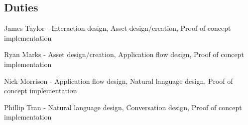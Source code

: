 \documentclass{sigchi}
\begin{document}
\subsection{Duties}

James Taylor - Interaction design, Asset design/creation, Proof of concept implementation

Ryan Marks - Asset design/creation, Application flow design, Proof of concept implementation

Nick Morrison - Application flow design, Natural language design, Proof of concept implementation

Phillip Tran - Natural language design, Conversation design, Proof of concept implementation




\balance{}



\end{document}
